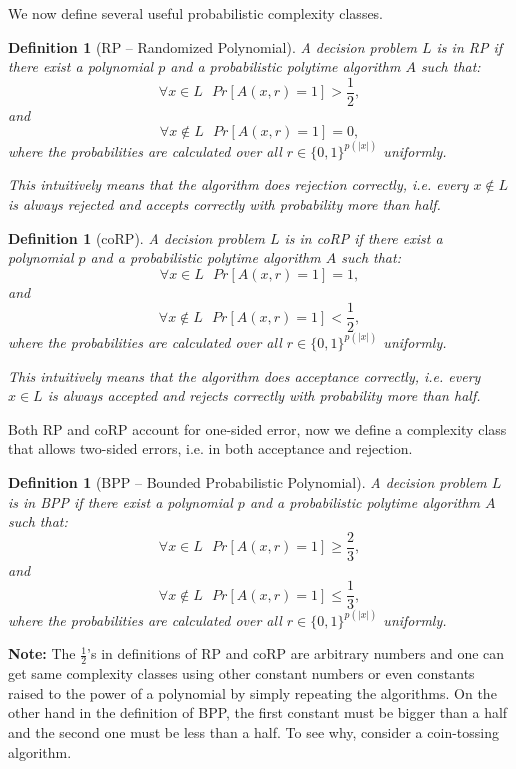 \documentclass[a4paper,10pt]{article}
\newtheorem{definition}[theorem]{Definition}
\begin{document}
We now define several useful probabilistic complexity classes.

\begin{definition}[RP -- Randomized Polynomial] \label{rpdef}
A decision problem $L$ is in RP if there exist a polynomial $p$ and a probabilistic polytime algorithm $A$ such that:
$$\forall x \in L ~~~ Pr[A(x, r) = 1] > \frac{1}{2},$$ and $$\forall x \not \in L ~~~ Pr[A(x, r) = 1] = 0,$$
where the probabilities are calculated over all $r \in \{0, 1\}^{p(\vert x \vert)}$ uniformly.

This intuitively means that the algorithm does rejection correctly, i.e. every $x \not \in L$ is always rejected and accepts correctly with probability more than half.
\end{definition}

\begin{definition}[coRP] 
A decision problem $L$ is in coRP if there exist a polynomial $p$ and a probabilistic polytime algorithm $A$ such that:
$$\forall x \in L ~~~ Pr[A(x, r) = 1] = 1,$$ and $$\forall x \not \in L ~~~ Pr[A(x, r) = 1] < \frac{1}{2},$$
where the probabilities are calculated over all $r \in \{0, 1\}^{p(\vert x \vert)}$ uniformly.

This intuitively means that the algorithm does acceptance correctly, i.e. every $x \in L$ is always accepted and rejects correctly with probability more than half.
\end{definition}

Both RP and coRP account for one-sided error, now we define a complexity class that allows two-sided errors, i.e. in both acceptance and rejection.

\begin{definition}[BPP -- Bounded Probabilistic Polynomial] 
A decision problem $L$ is in BPP if there exist a polynomial $p$ and a probabilistic polytime algorithm $A$ such that:
$$\forall x \in L ~~~ Pr[A(x, r) = 1] \geq \frac{2}{3},$$ and $$\forall x \not \in L ~~~ Pr[A(x, r) = 1] \leq \frac{1}{3},$$
where the probabilities are calculated over all $r \in \{0, 1\}^{p(\vert x \vert)}$ uniformly.
\end{definition}

\textbf{Note:} The $\frac{1}{2}$'s in definitions of RP and coRP are arbitrary numbers and one can get same complexity classes using other constant numbers or even constants raised to the power of a polynomial by simply repeating the algorithms. On the other hand in the definition of BPP, the first constant must be bigger than a half and the second one must be less than a half. To see why, consider a coin-tossing algorithm.
\end{document}
